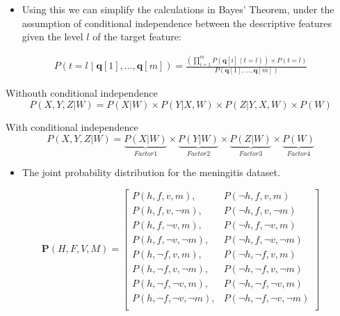 \documentclass[xcolor={table}]{beamer}
\begin{document}
 \begin{frame} 
 \begin{itemize}
 \item Using this we can simplify the calculations in Bayes' Theorem, under the assumption of conditional independence between the descriptive features given the level $l$ of the target feature: 
\end{itemize}
\begin{align*}
P(t=l \mid \mathbf{q}[1],\ldots,\mathbf{q}[m])=\frac{\left( \displaystyle \prod_{i=1}^{m} P(\mathbf{q}[i]\mid t=l) \right) \times P(t=l)}
{P(\mathbf{q}[1],\ldots,\mathbf{q}[m])}
\label{eq:bayesruleCondInd}
\end{align*}
\end{frame} 

\begin{frame}
\begin{block}{Withouth conditional independence}
\begin{equation*}
P(X,Y,Z|W)=P(X|W)\times P(Y|X,W)\times P(Z|Y,X,W) \times P(W)
\end{equation*}
\end{block}

\begin{block}{With conditional independence}
\begin{equation*}
P(X,Y,Z|W)=\underbrace{P(X|W)}_{Factor1}\times \underbrace{P(Y|W)}_{Factor2}\times \underbrace{P(Z|W)}_{Factor3} \times \underbrace{P(W)}_{Factor4}
\end{equation*}
\end{block}
\end{frame}

 \begin{frame} 
 \begin{itemize}
 	\item The joint probability distribution for the meningitis dataset.
\end{itemize}
\begin{equation*}
\mathbf{P}(H,F,V,M) = \left[ \begin{array}{ll} 
P(h, f, v, m),& P(\lnot h, f, v, m)\\
P(h, f, v, \lnot m),& P(\lnot h, f, v, \lnot m)\\
P(h, f, \lnot v, m),& P(\lnot h, f, \lnot v, m)\\
P(h, f, \lnot v, \lnot m),& P(\lnot h, f, \lnot v, \lnot m)\\
P(h, \lnot f, v, m),& P(\lnot h, \lnot f, v, m)\\
P(h, \lnot f, v, \lnot m),& P(\lnot h, \lnot f, v, \lnot m)\\
P(h, \lnot f, \lnot v, m),& P(\lnot h, \lnot f, \lnot v, m) \\
P(h, \lnot f, \lnot v, \lnot m),& P(\lnot h, \lnot f, \lnot v, \lnot m) \\ \end{array} \right]
\end{equation*}
\end{frame} 
\end{document}
